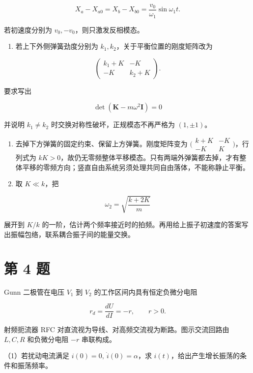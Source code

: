 \documentclass[12pt,a4paper,UTF8]{ctexart}
\newcommand{\tightlist}{\setlength{\itemsep}{0pt}\setlength{\parskip}{0pt}}
\begin{document}
\[
X_a-X_{a0}=X_b-X_{b0}
=\frac{v_0}{\omega_1}\sin\omega_1t.
\]

若初速度分别为 \(v_0,-v_0\)，则只激发反相模态。

\begin{enumerate}
\def\labelenumi{\arabic{enumi}.}
\setcounter{enumi}{1}
\tightlist
\item
  若上下外侧弹簧劲度分别为 \(k_1,k_2\)，关于平衡位置的刚度矩阵改为
\end{enumerate}

\[
\begin{pmatrix}
k_1+K&-K\\
-K&k_2+K
\end{pmatrix}.
\]

要求写出

\[
\det(\boldsymbol K-m\omega^2\boldsymbol I)=0
\]

并说明 \(k_1\ne k_2\) 时交换对称性破坏，正规模态不再严格为
\((1,\pm1)\)。

\begin{enumerate}
\def\labelenumi{\arabic{enumi}.}
\setcounter{enumi}{2}
\item
  去掉下方弹簧的固定约束、保留上方弹簧。刚度矩阵变为
  \(\bigl(\begin{smallmatrix}k+K&-K\\-K&K\end{smallmatrix}\bigr)\)，行列式为
  \(kK>0\)，故仍无零频整体平移模态。只有两端外弹簧都去掉，才有整体平移的零频方向；竖直自由系统另须处理共同自由落体，不能称静止平衡。
\item
  取 \(K\ll k\)，把
\end{enumerate}

\[
\omega_2=\sqrt{\frac{k+2K}{m}}
\]

展开到 \(K/k\)
的一阶，估计两个频率接近时的拍频。再用给上振子初速度的答案写出振幅包络，联系耦合振子间的能量交换。

\newpage

\section{第 4 题}\label{ux7b2c-4-ux9898}

Gunn 二极管在电压 \(V_1\) 到 \(V_2\) 的工作区间内具有恒定负微分电阻

\[
r_d=\frac{dU}{dI}=-r,\qquad r>0.
\]

射频扼流器 RFC 对直流视为导线、对高频交流视为断路。图示交流回路由
\(L,C,R\) 和负微分电阻 \(-r\) 串联构成。

（1）若扰动电流满足 \(i(0)=0,\ \dot i(0)=\alpha\)，求
\(i(t)\)，给出产生增长振荡的条件和振荡频率。
\end{document}
